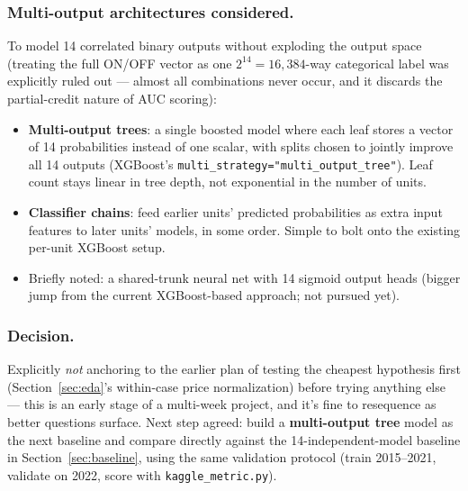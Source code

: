 \subsubsection*{Multi-output architectures considered.} To model 14 correlated binary outputs
without exploding the output space (treating the full ON/OFF vector as one
$2^{14}=16{,}384$-way categorical label was explicitly ruled out --- almost all combinations
never occur, and it discards the partial-credit nature of AUC scoring):
\begin{itemize}
  \item \textbf{Multi-output trees}: a single boosted model where each leaf stores a vector of
    14 probabilities instead of one scalar, with splits chosen to jointly improve all 14
    outputs (XGBoost's \texttt{multi\_strategy="multi\_output\_tree"}). Leaf count stays linear
    in tree depth, not exponential in the number of units.
  \item \textbf{Classifier chains}: feed earlier units' predicted probabilities as extra input
    features to later units' models, in some order. Simple to bolt onto the existing per-unit
    XGBoost setup.
  \item Briefly noted: a shared-trunk neural net with 14 sigmoid output heads (bigger jump from
    the current XGBoost-based approach; not pursued yet).
\end{itemize}

\subsubsection*{Decision.} Explicitly \emph{not} anchoring to the earlier plan of testing the
cheapest hypothesis first (Section~\ref{sec:eda}'s within-case price normalization) before
trying anything else --- this is an early stage of a multi-week project, and it's fine to
resequence as better questions surface. Next step agreed: build a \textbf{multi-output tree}
model as the next baseline and compare directly against the 14-independent-model baseline in
Section~\ref{sec:baseline}, using the same validation protocol (train 2015--2021, validate on
2022, score with \texttt{kaggle\_metric.py}).
